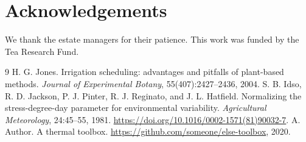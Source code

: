 \documentclass[10pt,twocolumn]{article}
\begin{document}
\section*{Acknowledgements}
We thank the estate managers for their patience. This work was funded by the Tea Research Fund.

\begin{thebibliography}{9}
 H. G. Jones. Irrigation scheduling: advantages and pitfalls of plant-based methods. \emph{Journal of Experimental Botany}, 55(407):2427--2436, 2004.
 S. B. Idso, R. D. Jackson, P. J. Pinter, R. J. Reginato, and J. L. Hatfield. Normalizing the stress-degree-day parameter for environmental variability. \emph{Agricultural Meteorology}, 24:45--55, 1981. \url{https://doi.org/10.1016/0002-1571(81)90032-7}.
 A. Author. A thermal toolbox. \url{https://github.com/someone/else-toolbox}, 2020.
\end{thebibliography}
\end{document}
